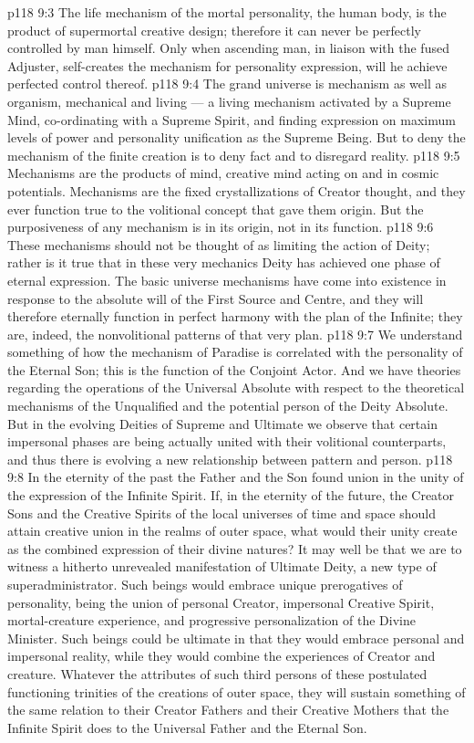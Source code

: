 \vs p118 9:3 The life mechanism of the mortal personality, the human body, is the product of supermortal creative design; therefore it can never be perfectly controlled by man himself. Only when ascending man, in liaison with the fused Adjuster, self\hyp{}creates the mechanism for personality expression, will he achieve perfected control thereof.
\vs p118 9:4 The grand universe is mechanism as well as organism, mechanical and living --- a living mechanism activated by a Supreme Mind, co\hyp{}ordinating with a Supreme Spirit, and finding expression on maximum levels of power and personality unification as the Supreme Being. But to deny the mechanism of the finite creation is to deny fact and to disregard reality.
\vs p118 9:5 Mechanisms are the products of mind, creative mind acting on and in cosmic potentials. Mechanisms are the fixed crystallizations of Creator thought, and they ever function true to the volitional concept that gave them origin. But the purposiveness of any mechanism is in its origin, not in its function.
\vs p118 9:6 These mechanisms should not be thought of as limiting the action of Deity; rather is it true that in these very mechanics Deity has achieved one phase of eternal expression. The basic universe mechanisms have come into existence in response to the absolute will of the First Source and Centre, and they will therefore eternally function in perfect harmony with the plan of the Infinite; they are, indeed, the nonvolitional patterns of that very plan.
\vs p118 9:7 We understand something of how the mechanism of Paradise is correlated with the personality of the Eternal Son; this is the function of the Conjoint Actor. And we have theories regarding the operations of the Universal Absolute with respect to the theoretical mechanisms of the Unqualified and the potential person of the Deity Absolute. But in the evolving Deities of Supreme and Ultimate we observe that certain impersonal phases are being actually united with their volitional counterparts, and thus there is evolving a new relationship between pattern and person.
\vs p118 9:8 In the eternity of the past the Father and the Son found union in the unity of the expression of the Infinite Spirit. If, in the eternity of the future, the Creator Sons and the Creative Spirits of the local universes of time and space should attain creative union in the realms of outer space, what would their unity create as the combined expression of their divine natures? It may well be that we are to witness a hitherto unrevealed manifestation of Ultimate Deity, a new type of superadministrator. Such beings would embrace unique prerogatives of personality, being the union of personal Creator, impersonal Creative Spirit, mortal\hyp{}creature experience, and progressive personalization of the Divine Minister. Such beings could be ultimate in that they would embrace personal and impersonal reality, while they would combine the experiences of Creator and creature. Whatever the attributes of such third persons of these postulated functioning trinities of the creations of outer space, they will sustain something of the same relation to their Creator Fathers and their Creative Mothers that the Infinite Spirit does to the Universal Father and the Eternal Son.
